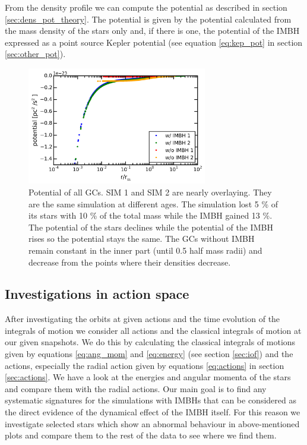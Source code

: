 \par From the density profile we can compute the potential as described in section \ref{sec:dens_pot_theory}. The potential is given by the potential calculated from the mass density of the stars only and, if there is one, the potential of the \ac{IMBH} expressed as a point source Kepler potential (see equation \eqref{eq:kep_pot} in section \ref{sec:other_pot}).
\begin{figure}[htbp]
	\centering
	\includegraphics[width=0.7\textwidth]{Plots/potential.png}
	\caption{Potential of all \acp{GC}. SIM 1 and SIM 2 are nearly overlaying. They are the same simulation at different ages. The simulation lost 5 \% of its stars with 10 \% of the total mass while the \ac{IMBH} gained 13 \%. The potential of the stars declines while the potential of the \ac{IMBH} rises so the potential stays the same. The \acp{GC} without \ac{IMBH} remain constant in the inner part (until 0.5 half mass radii) and decrease from the points where their densities decrease.}
\end{figure}


\subsection{Investigations in action space}\label{sec:action_space}
After investigating the orbits at given actions and the time evolution of the integrals of motion we consider all actions and the classical integrals of motion at our given snapshots. We do this by calculating the classical integrals of motions given by equations \eqref{eq:ang_mom} and \eqref{eq:energy} (see section \ref{sec:iof}) and the actions, especially the radial action given by equations \eqref{eq:actions} in section \ref{sec:actions}. We have a look at the energies and angular momenta of the stars and compare them with the radial actions. Our main goal is to find any systematic signatures for the simulations with \acp{IMBH} that can be considered as the direct evidence of the dynamical effect of the \ac{IMBH} itself. For this reason we investigate selected stars which show an abnormal behaviour in above-mentioned plots and compare them to the rest of the data to see where we find them.
